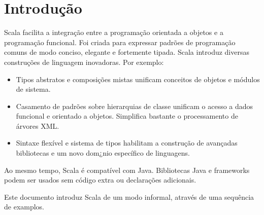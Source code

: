 \documentclass[a4paper,12pt,twoside,titlepage]{book}
\begin{document}
\frontmatter
\makedoctitle
\clearemptydoublepage
\tableofcontents
\mainmatter
\sloppy

\chapter{\label{chap:intro}Introdução}
Scala facilita a integração entre a  programação orientada a objetos e a programação funcional.
Foi criada para expressar padrões de programação comuns de modo conciso, elegante e fortemente tipada. 
Scala introduz diversas construções de linguagem inovadoras. Por exemplo:
\begin{itemize}

\item 
Tipos abstratos e composições mistas unificam conceitos de objetos e módulos de sistema.
\item 
Casamento de padrões sobre hierarquias de classe unificam o acesso a dados funcional e orientado a 
objetos. Simplifica bastante o processamento de árvores XML.
\item
Sintaxe flexível e sistema de tipos habilitam a construção de avançadas 
bibliotecas e um novo dom¿nio específico de linguagens.
\end{itemize}



Ao mesmo tempo, Scala é compatível com Java. Bibliotecas Java e frameworks
podem ser usados sem código extra ou declarações adicionais.

Este documento introduz Scala de um modo informal, através de uma sequência
de examplos.


\end{document}
